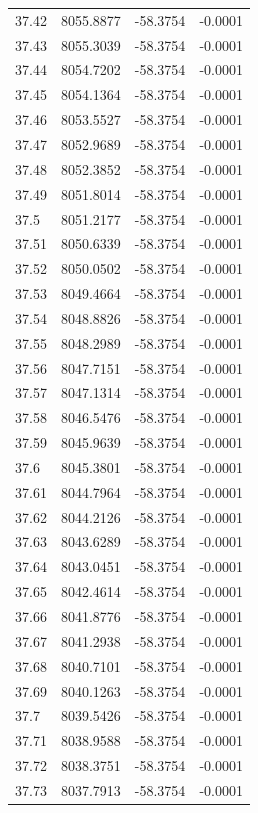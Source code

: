 \begin{table}[H]
\begin{tabular}{llll}
37.42 & 8055.8877 & -58.3754 & -0.0001 \\
37.43 & 8055.3039 & -58.3754 & -0.0001 \\
37.44 & 8054.7202 & -58.3754 & -0.0001 \\
37.45 & 8054.1364 & -58.3754 & -0.0001 \\
37.46 & 8053.5527 & -58.3754 & -0.0001 \\
37.47 & 8052.9689 & -58.3754 & -0.0001 \\
37.48 & 8052.3852 & -58.3754 & -0.0001 \\
37.49 & 8051.8014 & -58.3754 & -0.0001 \\
37.5 & 8051.2177 & -58.3754 & -0.0001 \\
37.51 & 8050.6339 & -58.3754 & -0.0001 \\
37.52 & 8050.0502 & -58.3754 & -0.0001 \\
37.53 & 8049.4664 & -58.3754 & -0.0001 \\
37.54 & 8048.8826 & -58.3754 & -0.0001 \\
37.55 & 8048.2989 & -58.3754 & -0.0001 \\
37.56 & 8047.7151 & -58.3754 & -0.0001 \\
37.57 & 8047.1314 & -58.3754 & -0.0001 \\
37.58 & 8046.5476 & -58.3754 & -0.0001 \\
37.59 & 8045.9639 & -58.3754 & -0.0001 \\
37.6 & 8045.3801 & -58.3754 & -0.0001 \\
37.61 & 8044.7964 & -58.3754 & -0.0001 \\
37.62 & 8044.2126 & -58.3754 & -0.0001 \\
37.63 & 8043.6289 & -58.3754 & -0.0001 \\
37.64 & 8043.0451 & -58.3754 & -0.0001 \\
37.65 & 8042.4614 & -58.3754 & -0.0001 \\
37.66 & 8041.8776 & -58.3754 & -0.0001 \\
37.67 & 8041.2938 & -58.3754 & -0.0001 \\
37.68 & 8040.7101 & -58.3754 & -0.0001 \\
37.69 & 8040.1263 & -58.3754 & -0.0001 \\
37.7 & 8039.5426 & -58.3754 & -0.0001 \\
37.71 & 8038.9588 & -58.3754 & -0.0001 \\
37.72 & 8038.3751 & -58.3754 & -0.0001 \\
37.73 & 8037.7913 & -58.3754 & -0.0001 \\

\end{tabular}
\end{table}
